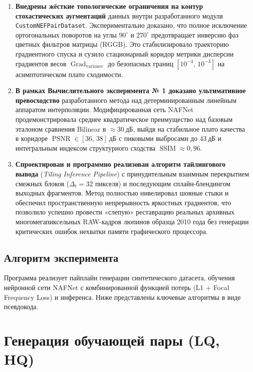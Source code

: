 \documentclass[12pt,a4paper]{article}
\begin{document}
\begin{enumerate}
    \item \textbf{Внедрены жёсткие топологические ограничения на контур стохастических аугментаций} данных внутри разработанного модуля \texttt{CustomNEFPairDataset}. Экспериментально доказано, что полное исключение ортогональных поворотов на углы $90^\circ$ и $270^\circ$ предотвращает инверсию фаз цветных фильтров матрицы (RGGB). Это стабилизировало траекторию градиентного спуска и сузило стационарный коридор метрики дисперсии градиентов весов $\operatorname{Grad}_{\operatorname{variance}}$ до безопасных границ $[10^{-4},\, 10^{-3}]$ на асимптотическом плато сходимости.
    
    \item \textbf{В рамках Вычислительного эксперимента № 1 доказано ультимативное превосходство} разработанного метода над детерминированным линейным аппаратом интерполяции. Модифицированная сеть NAFNet продемонстрировала среднее квадратическое преимущество над базовым эталоном сравнения Bilinear в $\approx 30~\textbf{дБ}$, выйдя на стабильное плато качества в коридоре $\operatorname{PSNR} \in [36,\, 38]~дБ$ с пиковыми выбросами до $43~дБ$ и интегральным индексом структурного сходства $\operatorname{SSIM} \approx 0{,}96$.
    
    \item \textbf{Спроектирован и программно реализован алгоритм тайлингового вывода} (\textit{Tiling Inference Pipeline}) с принудительным взаимным перекрытием смежных блоков ($\Delta_t = 32$ пикселя) и последующим сплайн-блендингом выходных фрагментов. Метод полностью нивелировал шовные стыки и обеспечил пространственную непрерывность яркостных градиентов, что позволило успешно провести «слепую» реставрацию реальных архивных многомегапиксельных RAW-кадров люпинов образца 2010 года без генерации критических ошибок нехватки памяти графического процессора.
\end{enumerate}

\subsection{Алгоритм эксперимента}
Программа реализует пайплайн генерации синтетического датасета, обучения нейронной сети NAFNet с комбинированной функцией потерь (L1 + Focal Frequency Loss) и инференса. Ниже представлены ключевые алгоритмы в виде псевдокода.

\section{Генерация обучающей пары (LQ, HQ)}
\label{sec:generation}
\end{document}
